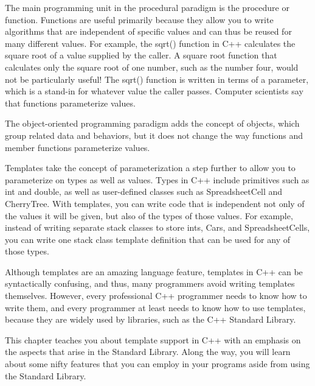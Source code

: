 The main programming unit in the procedural paradigm is the procedure or function. Functions are useful primarily because they allow you to write algorithms that are independent of specific values and can thus be reused for many different values. For example, the sqrt() function in C++ calculates the square root of a value supplied by the caller. A square root function that calculates only the square root of one number, such as the number four, would not be particularly useful! The sqrt() function is written in terms of a parameter, which is a stand-in for whatever value the caller passes. Computer scientists say that functions parameterize values.

The object-oriented programming paradigm adds the concept of objects, which group related data and behaviors, but it does not change the way functions and member functions parameterize values.

Templates take the concept of parameterization a step further to allow you to parameterize on types as well as values. Types in C++ include primitives such as int and double, as well as user-defined classes such as SpreadsheetCell and CherryTree. With templates, you can write code that is independent not only of the values it will be given, but also of the types of those values. For example, instead of writing separate stack classes to store ints, Cars, and SpreadsheetCells, you can write one stack class template definition that can be used for any of those types.

Although templates are an amazing language feature, templates in C++ can be syntactically confusing, and thus, many programmers avoid writing templates themselves. However, every professional C++ programmer needs to know how to write them, and every programmer at least needs to know how to use templates, because they are widely used by libraries, such as the C++ Standard Library.

This chapter teaches you about template support in C++ with an emphasis on the aspects that arise in the Standard Library. Along the way, you will learn about some nifty features that you can employ in your programs aside from using the Standard Library.
